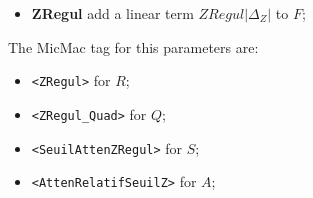 \begin{itemize}
   \item {\bf ZRegul} add a linear term $ZRegul |\Delta_Z| $ to $F$;
\end{itemize}


The MicMac tag for this parameters are:

\begin{itemize}
   \item {\tt <ZRegul>}  for $R$;
   \item {\tt <ZRegul\_Quad>}  for $Q$;
   \item {\tt <SeuilAttenZRegul>}  for $S$;
   \item {\tt <AttenRelatifSeuilZ>}  for $A$;
\end{itemize}






